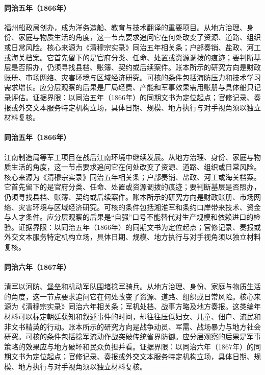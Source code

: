 \hypertarget{social:EQ-1866-FUJIAN-SHIPYARD}{}\paragraph{同治五年（1866年）}福州船政局创办，成为洋务造船、教育与技术翻译的重要项目。从地方治理、身份、家庭与物质生活的角度，这一节点要求追问它在何处改变了资源、道路、组织或日常风险。核心来源为《清穆宗实录》同治五年相关条；户部奏销、盐政、河工或海关档案。它首先留下的是官府分类、任命、处置或资源调拨的痕迹；要判断基层是否照办，仍须寻找县档、账簿、契约或后续案件。账本所示的研究方向是财政账册、市场网络、灾害环境与区域经济研究。可核的条件包括海防压力和技术学习需求增长。应分层观察的后果是厂局经费、产能和军事效果需用账册与具体船只记录评估。证据界限：以同治五年（1866年）的同期文书为定位起点；官修记录、奏报或外交文本服务特定机构立场，具体日期、规模、地方执行与对手视角须以独立材料复核。
\hypertarget{social:EQ-1866-NINGBO-SHANGHAI-INDUSTRY}{}\paragraph{同治五年（1866年）}江南制造局等军工项目在战后江南环境中继续发展。从地方治理、身份、家庭与物质生活的角度，这一节点要求追问它在何处改变了资源、道路、组织或日常风险。核心来源为《清穆宗实录》同治五年相关条；户部奏销、盐政、河工或海关档案。它首先留下的是官府分类、任命、处置或资源调拨的痕迹；要判断基层是否照办，仍须寻找县档、账簿、契约或后续案件。账本所示的研究方向是财政账册、市场网络、灾害环境与区域经济研究。可核的条件包括湘淮军和条约口岸带来技术、资金与人才条件。应分层观察的后果是“自强”口号不能替代对生产规模和依赖进口的检验。证据界限：以同治五年（1866年）的同期文书为定位起点；官修记录、奏报或外交文本服务特定机构立场，具体日期、规模、地方执行与对手视角须以独立材料复核。
\hypertarget{social:EQ-1867-NIAN-CAVALRY-CAMPAIGN}{}\paragraph{同治六年（1867年）}清军以河防、堡垒和机动军队围堵捻军骑兵。从地方治理、身份、家庭与物质生活的角度，这一节点要求追问它在何处改变了资源、道路、组织或日常风险。核心来源为《清穆宗实录》同治六年相关条；军机处档、战事方略及地方奏报。这类编年材料可以标定朝廷获知和叙述事件的时间，却往往压低妇女、儿童、佃户、流民和非文书精英的行动。账本所示的研究方向是战争动员、军需、战场暴力与地方社会研究。可核的条件包括捻军流动作战突破传统省界防御。应分层观察的后果是军事策略的效果应与地方破坏和民众负担并看。证据界限：以同治六年（1867年）的同期文书为定位起点；官修记录、奏报或外交文本服务特定机构立场，具体日期、规模、地方执行与对手视角须以独立材料复核。
